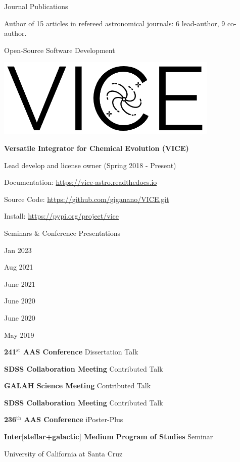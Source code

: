 \documentclass[cv.tex]{subfiles}
\begin{document}
{\color{themecolor} \large Journal Publications}
\par\noindent
Author of 15 articles in refereed astronomical journals: 6 lead-author,
9 co-author.
\par\noindent
{}

\par\null\par\noindent
{
{\color{themecolor} \large Open-Source Software Development}
\par\noindent
\parbox{0.35\textwidth}{%
	\centering
	\includegraphics[scale = 0.33]{vice-logo.png}
}
\parbox{0.63\textwidth}{%
	\textbf{Versatile Integrator for Chemical Evolution (VICE)} \par
	Lead develop and license owner (Spring 2018 - Present) \par
	Documentation: \url{https://vice-astro.readthedocs.io} \par
	Source Code: \url{https://github.com/giganano/VICE.git} \par
	Install: \url{https://pypi.org/project/vice}
}
}

\newpage
\noindent
{\color{themecolor} \large Seminars \& Conference Presentations}
\par\noindent
\parbox{0.18\textwidth}{%
	\raggedleft
	Jan 2023 \par
	Aug 2021 \par
	June 2021 \par
	June 2020 \par
	June 2020 \par
	May 2019 \par
	\null
}
\hspace{1mm}
\parbox{0.76\textwidth}{%
	\textbf{241$^\text{st}$ AAS Conference} \hfill Dissertation Talk \par
	\textbf{SDSS Collaboration Meeting} \hfill Contributed Talk \par
	\textbf{GALAH Science Meeting} \hfill Contributed Talk \par
	\textbf{SDSS Collaboration Meeting} \hfill Contributed Talk \par
	\textbf{236$^\text{th}$ AAS Conference} \hfill iPoster-Plus \par
	\textbf{Inter[stellar+galactic] Medium Program of Studies} \hfill Seminar
	\par
	University of California at Santa Cruz
}
\end{document}
